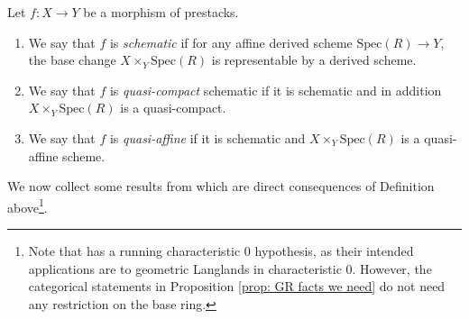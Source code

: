 \documentclass[10pt,reqno]{amsart}
\numberwithin{equation}{section}
\newcommand{\spec}{{\mathrm{Spec}}}
\begin{document}
\begin{definition}\label{def: quasi-affine etc}
Let $f\colon X\to Y$ be a morphism of prestacks.
\begin{enumerate}
    \item  We say that $f$ is \emph{schematic} if for any affine derived scheme $\spec(R)\to Y$, the base change $X\times_{Y}\spec(R)$ is representable by a derived scheme.
    \item  We say that $f$ is \emph{quasi-compact} schematic if it is schematic and in addition $X\times_{Y}\spec(R)$ is a quasi-compact.
    \item We say that $f$ is \emph{quasi-affine} if it is schematic and $X\times_{Y}\spec(R)$  is a quasi-affine scheme.
\end{enumerate}
   
\end{definition}

We now collect some results from \cite{GaitsgoryRozenblyum2017SAGI} which are direct consequences of Definition  above\footnote{Note that \cite{GaitsgoryRozenblyum2017SAGI} has a running characteristic $0$ hypothesis, as their intended applications are to geometric Langlands in characteristic $0$. However, the categorical statements in Proposition \ref{prop: GR facts we need} do not need any restriction on the base ring.}. 
\end{document}
